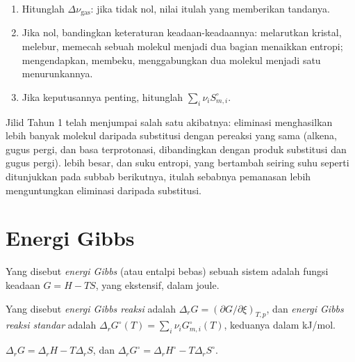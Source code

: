\begin{method}\label{met:b2:reaction-free-energy:entropy-sign}
\begin{enumerate}
  \item Hitunglah $\Delta\nu_{\text{gas}}$: jika tidak nol, nilai itulah
        yang memberikan tandanya.
  \item Jika nol, bandingkan keteraturan keadaan-keadaannya: melarutkan
        kristal, melebur, memecah sebuah molekul menjadi dua bagian
        menaikkan entropi; mengendapkan, membeku, menggabungkan dua molekul
        menjadi satu menurunkannya.
  \item Jika keputusannya penting, hitunglah $\sum_i\nu_iS^\circ_{m,i}$.
\end{enumerate}
\end{method}

Jilid Tahun 1 telah menjumpai salah satu akibatnya: eliminasi
menghasilkan lebih banyak molekul daripada substitusi dengan pereaksi
yang sama (alkena, gugus pergi, dan basa terprotonasi, dibandingkan dengan
produk substitusi dan gugus pergi).  lebih besar, dan
suku entropi, yang bertambah seiring suhu seperti ditunjukkan pada subbab
berikutnya, itulah sebabnya pemanasan lebih menguntungkan eliminasi
daripada substitusi.

\section{Energi Gibbs}

\begin{definition}\label{def:b2:reaction-free-energy:gibbs-energy}
Yang disebut \emph{energi Gibbs} (atau entalpi bebas)
sebuah sistem adalah fungsi keadaan $G = H - TS$, yang ekstensif, dalam
joule.
\end{definition}

\begin{definition}\label{def:b2:reaction-free-energy:reaction-gibbs}
Yang disebut \emph{energi Gibbs reaksi} adalah
$\Delta_r G
= (\partial G/\partial\xi)_{T,p}$, dan \emph{energi Gibbs
reaksi standar} adalah
$\Delta_r G^\circ(T) =
\sum_i\nu_iG^\circ_{m,i}(T)$, keduanya dalam
\unit{kJ/mol}.
\end{definition}

\begin{proposition}\label{prop:b2:reaction-free-energy:g-h-s}
$\Delta_r G = \Delta_r H - T\Delta_r S$, dan $\Delta_r G^\circ = \Delta_r
H^\circ - T\Delta_r S^\circ$.
\end{proposition}

